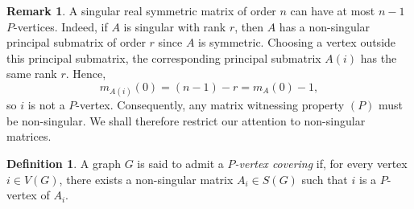 \documentclass[12pt,reqno]{amsart}
\theoremstyle{plain}
\theoremstyle{definition}
\newtheorem{defn}{Definition}
\newtheorem{rem}{Remark}
\theoremstyle{block}
\theoremstyle{remark}
\numberwithin{equation}{section}
\begin{document}




\begin{rem}
A singular real symmetric matrix of order \(n\) can have at most \(n-1\) \(P\)-vertices. Indeed, if \(A\) is singular with rank \(r\), then \(A\) has a non-singular principal submatrix of order \(r\) since \(A\) is symmetric. Choosing a vertex outside this principal submatrix, the corresponding principal submatrix \(A(i)\) has the same rank \(r\). Hence,
\[
m_{A(i)}(0)=(n-1)-r=m_A(0)-1,
\]
so \(i\) is not a \(P\)-vertex. Consequently, any matrix witnessing property \((P)\)
must be non-singular. We shall therefore restrict our attention to
non-singular matrices.
\end{rem}



\begin{defn}
A graph \(G\) is said to admit a \emph{\(P\)-vertex covering} if, for
every vertex \(i\in V(G)\), there exists a non-singular matrix
\(A_i\in S(G)\) such that \(i\) is a \(P\)-vertex of \(A_i\).
\end{defn}
\end{document}
